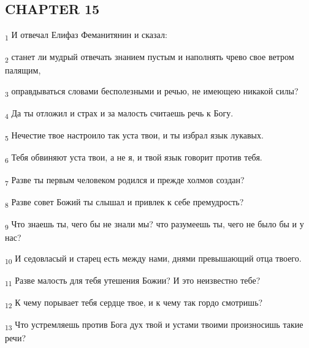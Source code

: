 \subsection{CHAPTER 15}
\begin{tcolorbox}
\textsubscript{1} И отвечал Елифаз Феманитянин и сказал:
\end{tcolorbox}
\begin{tcolorbox}
\textsubscript{2} станет ли мудрый отвечать знанием пустым и наполнять чрево свое ветром палящим,
\end{tcolorbox}
\begin{tcolorbox}
\textsubscript{3} оправдываться словами бесполезными и речью, не имеющею никакой силы?
\end{tcolorbox}
\begin{tcolorbox}
\textsubscript{4} Да ты отложил и страх и за малость считаешь речь к Богу.
\end{tcolorbox}
\begin{tcolorbox}
\textsubscript{5} Нечестие твое настроило так уста твои, и ты избрал язык лукавых.
\end{tcolorbox}
\begin{tcolorbox}
\textsubscript{6} Тебя обвиняют уста твои, а не я, и твой язык говорит против тебя.
\end{tcolorbox}
\begin{tcolorbox}
\textsubscript{7} Разве ты первым человеком родился и прежде холмов создан?
\end{tcolorbox}
\begin{tcolorbox}
\textsubscript{8} Разве совет Божий ты слышал и привлек к себе премудрость?
\end{tcolorbox}
\begin{tcolorbox}
\textsubscript{9} Что знаешь ты, чего бы не знали мы? что разумеешь ты, чего не было бы и у нас?
\end{tcolorbox}
\begin{tcolorbox}
\textsubscript{10} И седовласый и старец есть между нами, днями превышающий отца твоего.
\end{tcolorbox}
\begin{tcolorbox}
\textsubscript{11} Разве малость для тебя утешения Божии? И это неизвестно тебе?
\end{tcolorbox}
\begin{tcolorbox}
\textsubscript{12} К чему порывает тебя сердце твое, и к чему так гордо смотришь?
\end{tcolorbox}
\begin{tcolorbox}
\textsubscript{13} Что устремляешь против Бога дух твой и устами твоими произносишь такие речи?
\end{tcolorbox}
